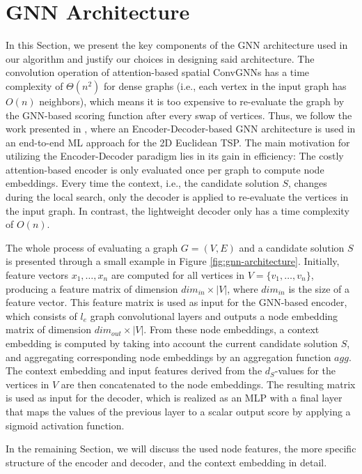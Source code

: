 \documentclass[draft,final]{vutinfth} %
\begin{document}
\section{GNN Architecture}\label{sec:gnn-architecture}
In this Section, we present the key components of the GNN architecture used in our algorithm and justify our choices in designing said architecture. 
The convolution operation of attention-based spatial ConvGNNs has a time complexity of $\Theta(n^2)$ for dense graphs (i.e., each vertex in the input graph has $O(n)$ neighbors), which means it is too expensive to re-evaluate the graph by the GNN-based scoring function after every swap of vertices. 
Thus, we follow the work presented in \cite{Kool2019}, where an Encoder-Decoder-based GNN architecture is used in an end-to-end ML approach for the 2D Euclidean TSP. 
The main motivation for utilizing the Encoder-Decoder paradigm lies in its gain in efficiency: The costly attention-based encoder is only evaluated once per graph to compute node embeddings. Every time the context, i.e., the candidate solution $S$, changes during the local search, only the decoder is applied to re-evaluate the vertices in the input graph. In contrast, the lightweight decoder only has a time complexity of $O(n)$. 

The whole process of evaluating a graph $G = (V, E)$ and a candidate solution $S$ is presented through a small example in Figure \ref{fig:gnn-architecture}. 
Initially, feature vectors $x_1, \dots, x_n$ are computed for all vertices in $V = \{v_1, \dots, v_n\}$, producing a feature matrix of dimension $\mathit{dim_{in}} \times |V|$, where $\mathit{dim_{in}}$ is the size of a feature vector. This feature matrix is used as input for the GNN-based encoder, which consists of $l_e$ graph convolutional layers and outputs a node embedding matrix of dimension $\mathit{dim_{out}} \times |V|$. From these node embeddings, a context embedding is computed by taking into account the current candidate solution $S$, and aggregating corresponding node embeddings by an aggregation function $\mathit{agg}$. The context embedding and input features derived from the $d_S$-values for the vertices in $V$ are then concatenated to the node embeddings. The resulting matrix is used as input for the decoder, which is realized as an MLP with a final layer that maps the values of the previous layer to a scalar output score by applying a sigmoid activation function. 

In the remaining Section, we will discuss the used node features, the more specific structure of the encoder and decoder, and the context embedding in detail. 
\end{document}
